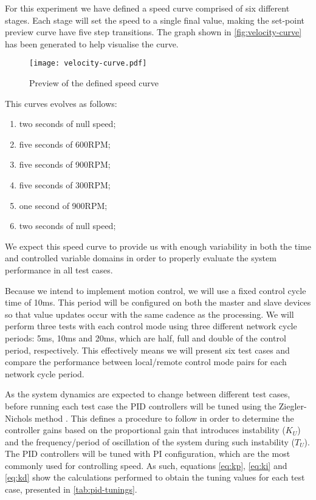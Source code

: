 For this experiment we have defined a speed curve comprised of six different stages.
Each stage will set the speed to a single final value, making the set-point preview curve have five step transitions.
The graph shown in \autoref{fig:velocity-curve} has been generated to help visualise the curve.

\begin{figure}[htp]
	\centering
	\texttt{[image: velocity-curve.pdf]}
	\caption{Preview of the defined speed curve}
	\label{fig:velocity-curve}
\end{figure}

This curves evolves as follows:
\begin{enumerate}
	\item two seconds of null speed;
	\item five seconds of 600RPM;
	\item five seconds of 900RPM;
	\item five seconds of 300RPM;
	\item one second of 900RPM;
	\item two seconds of null speed;
\end{enumerate}
We expect this speed curve to provide us with enough variability in both the time and controlled variable domains in order to properly evaluate the system performance in all test cases.

Because we intend to implement motion control, we will use a fixed control cycle time of 10ms.
This period will be configured on both the master and slave devices so that value updates occur with the same cadence as the processing.
We will perform three tests with each control mode using three different network cycle periods: 5ms, 10ms and 20ms, which are half, full and double of the control period, respectively.
This effectively means we will present six test cases and compare the performance between local/remote control mode pairs for each network cycle period.

As the system dynamics are expected to change between different test cases, before running each test case the PID controllers will be tuned using the Ziegler-Nichols method \cite{pid:zn-method}.
This defines a procedure to follow in order to determine the controller gains based on the proportional gain that introduces instability ($K_U$) and the frequency/period of oscillation of the system during such instability ($T_U$).
The PID controllers will be tuned with PI configuration, which are the most commonly used for controlling speed.
As such, equations \ref{eq:kp}, \ref{eq:ki} and \ref{eq:kd} show the calculations performed to obtain the tuning values for each test case, presented in \autoref{tab:pid-tunings}.

